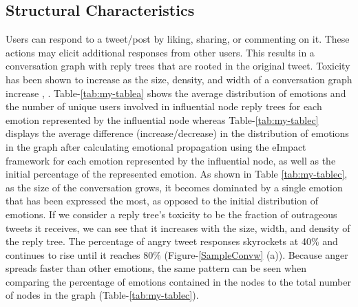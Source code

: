 \documentclass[acmtog]{acmart}
\begin{document}
\subsection{Structural Characteristics}
Users can respond to a tweet/post by liking, sharing, or commenting on it. These actions may elicit additional responses from other users. This results in a conversation graph with reply trees that are rooted in the original tweet. Toxicity has been shown to increase as the size, density, and width of a conversation graph increase \cite{kanavos2014conversation}, \cite{saveski2021structure}. Table-\ref{tab:my-tablea} shows the average distribution of emotions and the number of unique users involved in influential node reply trees for each emotion represented by the influential node whereas Table-\ref{tab:my-tablec} displays the average difference (increase/decrease) in the distribution of emotions in the graph after calculating emotional propagation using the eImpact framework for each emotion represented by the influential node, as well as the initial percentage of the represented emotion. As shown in Table \ref{tab:my-tablec}, as the size of the conversation grows, it becomes dominated by a single emotion that has been expressed the most, as opposed to the initial distribution of emotions. If we consider a reply tree's toxicity to be the fraction of outrageous tweets it receives, we can see that it increases with the size, width, and density of the reply tree. The percentage of angry tweet responses skyrockets at 40\% and continues to rise until it reaches 80\% (Figure-\ref{SampleConvw} (a)). Because anger spreads faster than other emotions, the same pattern can be seen when comparing the percentage of emotions contained in the nodes to the total number of nodes in the graph (Table-\ref{tab:my-tablec}). 
\end{document}
